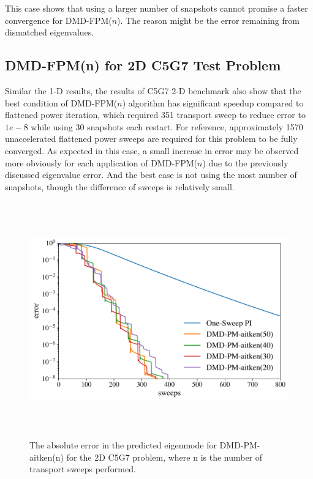 This case shows that using a larger number of snapshots cannot promise a faster convergence for DMD-FPM($n$).
The reason might be the error remaining from dismatched eigenvalues.

\subsection{DMD-FPM(n) for 2D C5G7 Test Problem}

Similar the 1-D results, the results of C5G7 2-D benchmark also show that the best condition of DMD-FPM($n$) algorithm has significant speedup compared to flattened power iteration, which required 351 transport sweep to reduce error to $1e-8$ while using 30 snapshots each restart.
For reference, approximately 1570 unaccelerated flattened power sweeps are required for this problem to be fully converged.
As expected in this case, a small increase in error may be observed more obviously for each application of DMD-FPM($n$) due to the previously discussed eigenvalue error.
And the best case is not using the most number of snapshots, though the difference of sweeps is relatively small.

\begin{figure}[htb]%
    \centering
    \includegraphics[height=4.0in]{tex/figures/dmd_ospi_semilog_c5g7.pdf}
    \caption{The absolute error in the predicted eigenmode for DMD-PM-aitken(n) for the 2D C5G7 problem, where n is the number of transport sweeps performed.}
    \label{fig:DMD-FPM_2d}
\end{figure}

